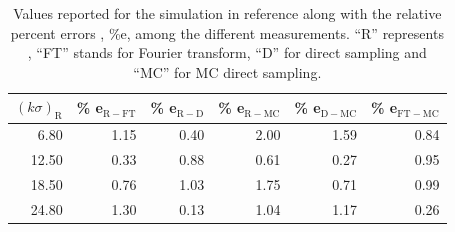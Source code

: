 \documentclass[%
aps,
pra,%
amsmath,amssymb,
preprint,%
reprint,%
notitlepage,
a4paper]{revtex4-1}
\begin{document}
\begin{table}
\begin{tabular}{rrrrrr}
	\hline
	$(k\sigma)_{\mathrm{R}}$ &   \% e$_{\mathrm{R-FT}}$ &   \% e$_{\mathrm{R-D}}$ &   \% e$_{\mathrm{R-MC}}$ &   \% e$_{\mathrm{D-MC}}$ &   \% e$_{\mathrm{FT-MC}}$ \\
	\hline
	6.80 &                     1.15 &                    0.40 &                     2.00 &                     1.59 &                      0.84 \\
	12.50 &                     0.33 &                    0.88 &                     0.61 &                     0.27 &                      0.95 \\
	18.50 &                     0.76 &                    1.03 &                     1.75 &                     0.71 &                      0.99 \\
	24.80 &                     1.30 &                    0.13 &                     1.04 &                     1.17 &                      0.26 \\
	\hline
\end{tabular}

\caption{\label{tab:sofk}Values reported for the simulation in reference \cite{Rahman1964} along with the relative percent errors , \%e, among the different measurements. ``R'' represents \citet{Rahman1964}, ``FT'' stands for Fourier transform, ``D'' for direct sampling and ``MC'' for MC direct sampling.}
\end{table}
\end{document}
